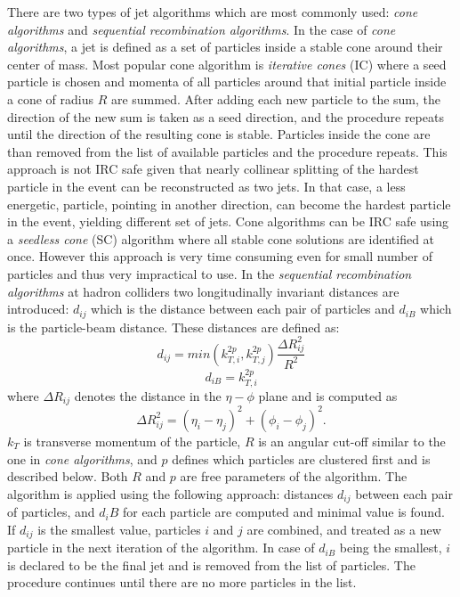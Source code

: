 \par There are two types of jet algorithms which are most commonly used: \textit{cone algorithms} and \textit{sequential recombination algorithms}. In the case of \textit{cone algorithms}, a jet is defined as a set of particles inside a stable cone around their center of mass. Most popular cone algorithm is \textit{iterative cones} (IC) where a seed particle is chosen and momenta of all particles around that initial particle inside a cone of radius $R$ are summed. After adding each new particle to the sum, the direction of the new sum is taken as a seed direction, and the procedure repeats until the direction of the resulting cone is stable. Particles inside the cone are than removed from the list of available particles and the procedure repeats. This approach is not IRC safe given that nearly collinear splitting of the hardest particle in the event can be reconstructed as two jets. In that case, a less energetic, particle, pointing in another direction, can become the hardest particle in the event, yielding different set of jets. Cone algorithms can be IRC safe using a \textit{seedless cone} (SC) algorithm where all stable cone solutions are identified at once. However this approach is very time consuming even for small number of particles and thus very impractical to use.
In the \textit{sequential recombination algorithms} at hadron colliders two longitudinally invariant distances are introduced: $d_{ij}$ which is the distance between each pair of particles and $d_{iB}$ which is the particle-beam distance. These distances are defined as: 
\begin{equation}
d_{ij} = min(k_{T,i}^{2p},k_{T,j}^{2p}) \frac{\Delta R_{ij}^2}{R^2}
\end{equation}
\begin{equation}
d_{iB}=k_{T,i}^{2p}
\end{equation}
where $\Delta R_{ij}$ denotes the distance in the $\eta -\phi$ plane and is computed as $$\Delta R_{ij}^2 = (\eta_i-\eta_j)^2+(\phi_i-\phi_j)^2.$$ $k_T$ is transverse momentum of the particle, $R$ is an angular cut-off similar to the one in \textit{cone algorithms},  and $p$ defines which particles are clustered first and is described below. Both $R$ and $p$ are free parameters of the algorithm. The algorithm is applied using the following approach: distances $d_{ij}$ between each pair of particles, and $d_iB$ for each particle are computed and minimal value is found. If $d_{ij}$ is the smallest value, particles $i$ and $j$ are combined, and treated as a new particle in the next iteration of the algorithm. In case of $d_{iB}$ being the smallest, $i$ is declared to be the final jet and is removed from the list of particles. The procedure continues until there are no more particles in the list.
